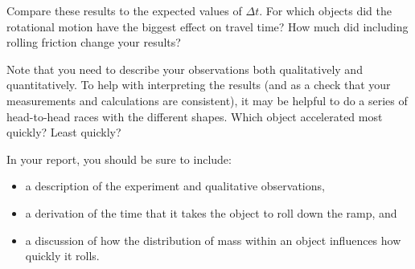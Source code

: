 \documentclass[11pt,letterpaper]{article}
\begin{document}
Compare these results to the expected values of $\Delta{t}$. For which objects did the rotational motion have the biggest effect on travel time? How much did including rolling friction change your results?

Note that you need to describe your observations both qualitatively and quantitatively. To help with interpreting the results (and as a check that your measurements and calculations are consistent), it may be helpful to do a series of head-to-head races with the different shapes. Which object accelerated most quickly? Least quickly?

In your report, you should be sure to include:
\begin{itemize}
\item a description of the experiment and qualitative observations,
\item a derivation of the time that it takes the object to roll down the ramp, and
\item a discussion of how the distribution of mass within an object influences how quickly it rolls.
\end{itemize}
\end{document}
